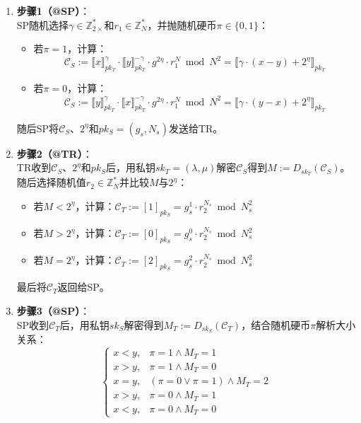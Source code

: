 \begin{enumerate}[leftmargin=*, nosep]
    \item \textbf{步骤1（@SP）}：\\
    SP随机选择\(\gamma\in\mathbb{Z}^{*}_{2\times}\)和\(r_{1}\in\mathbb{Z}^{*}_{N}\)，并抛随机硬币\(\pi\in\{0,1\}\)：
    \begin{itemize}
        \item 若\(\pi=1\)，计算：
        \[
        \mathcal{C}_{S}:=\llbracket x\rrbracket_{pk_{T}}^{\gamma}\cdot\llbracket y\rrbracket_{pk_{T}}^{-\gamma}\cdot g^{2\eta}\cdot r_{1}^{N}\bmod N^{2}=\llbracket \gamma\cdot(x-y)+2^{\eta}\rrbracket_{pk_{T}}
        \]
        \item 若\(\pi=0\)，计算：
        \[
        \mathcal{C}_{S}:=\llbracket y\rrbracket_{pk_{T}}^{\gamma}\cdot\llbracket x\rrbracket_{pk_{T}}^{-\gamma}\cdot g^{2\eta}\cdot r_{1}^{N}\bmod N^{2}=\llbracket \gamma\cdot(y-x)+2^{\eta}\rrbracket_{pk_{T}}
        \]
    \end{itemize}
    随后SP将\(\mathcal{C}_{S}\)、\(2^{\eta}\)和\(pk_{S}=(g_{s},N_{s})\)发送给TR。

    \item \textbf{步骤2（@TR）}：\\
    TR收到\(\mathcal{C}_{S}\)、\(2^{\eta}\)和\(pk_{S}\)后，用私钥\(sk_{T}=(\lambda,\mu)\)解密\(\mathcal{C}_{S}\)得到\(M:=D_{sk_{T}}(\mathcal{C}_{S})\)。随后选择随机值\(r_{2}\in\mathbb{Z}_{N}^{*}\)并比较\(M\)与\(2^{\eta}\)：
    \begin{itemize}
        \item 若\(M<2^{\eta}\)，计算：\(\mathcal{C}_{T}:=[1]_{pk_{S}}=g_{s}^{1}\cdot r_{2}^{N_{s}}\bmod N_{s}^{2}\)
        \item 若\(M>2^{\eta}\)，计算：\(\mathcal{C}_{T}:=[0]_{pk_{S}}=g_{s}^{0}\cdot r_{2}^{N_{s}}\bmod N_{s}^{2}\)
        \item 若\(M=2^{\eta}\)，计算：\(\mathcal{C}_{T}:=[2]_{pk_{S}}=g_{s}^{2}\cdot r_{2}^{N_{s}}\bmod N_{s}^{2}\)
    \end{itemize}
    最后将\(\mathcal{C}_{T}\)返回给SP。

    \item \textbf{步骤3（@SP）}：\\
    SP收到\(\mathcal{C}_{T}\)后，用私钥\(sk_{S}\)解密得到\(M_{T}:=D_{sk_{S}}(\mathcal{C}_{T})\)，结合随机硬币\(\pi\)解析大小关系：
    \[
    \begin{cases}
    x<y, & \pi=1 \land M_{T}=1\\
    x>y, & \pi=1 \land M_{T}=0\\
    x=y, & (\pi=0 \lor \pi=1) \land M_{T}=2\\
    x>y, & \pi=0 \land M_{T}=1\\
    x<y, & \pi=0 \land M_{T}=0
    \end{cases}
    \]
\end{enumerate}

